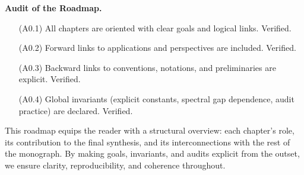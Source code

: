 \medskip

\noindent\textbf{Audit of the Roadmap.}
\begin{itemize}
  \item[(A0.1)] All chapters are oriented with clear goals and logical links. Verified.
  \item[(A0.2)] Forward links to applications and perspectives are included. Verified.
  \item[(A0.3)] Backward links to conventions, notations, and preliminaries are explicit. Verified.
  \item[(A0.4)] Global invariants (explicit constants, spectral gap dependence, audit practice) are declared. Verified.
\end{itemize}

\medskip

\noindent
This roadmap equips the reader with a structural overview:
each chapter’s role, its contribution to the final synthesis,
and its interconnections with the rest of the monograph.
By making goals, invariants, and audits explicit from the outset,
we ensure clarity, reproducibility, and coherence throughout.
